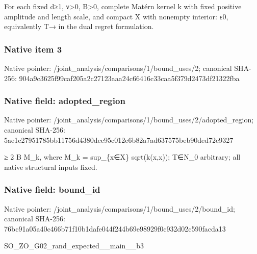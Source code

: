 \documentclass[10pt,a4paper]{article}
\begin{document}
\begingroup\raggedright\sloppy For each fixed d{\AtlasUnicodeSymbols ≥}\allowbreak{}1,\allowbreak{} {\AtlasUnicodeText ν}\allowbreak{}>0,\allowbreak{} B>0,\allowbreak{} complete Mat{\AtlasUnicodeText é}\allowbreak{}rn kernel k with fixed positive amplitude and length scale,\allowbreak{} and compact X with nonempty interior:\allowbreak{} {\AtlasUnicodeText ε}\allowbreak{}0,\allowbreak{} equivalently T{\AtlasUnicodeSymbols →}\allowbreak{} in the dual regret formulation.\par\endgroup

\subsubsection{Native item 3}
Native pointer: /joint\_\allowbreak{}analysis/comparisons/1/bound\_\allowbreak{}uses/2; canonical SHA-256: 904a9c3625f99caf205a2c27123aaa24c66416c33caa5f379d2473df21322fba

\subsubsection{Native field: adopted\_\allowbreak{}region}
Native pointer: /joint\_\allowbreak{}analysis/comparisons/1/bound\_\allowbreak{}uses/2/adopted\_\allowbreak{}region; canonical SHA-256: 5ae1c27951785bb11756d4380dcc95c012e6b82a7ad637575beb90ded72c9327

\begingroup\raggedright{}\allowbreak{} {\AtlasUnicodeSymbols ≥}\allowbreak{} 2 B M\_\allowbreak{}k,\allowbreak{} where M\_\allowbreak{}k =\allowbreak{} sup\_\allowbreak{}\{x{\AtlasUnicodeSymbols ∈}\allowbreak{}X\} sqrt(k(x,\allowbreak{}x));\allowbreak{} T{\AtlasUnicodeSymbols ∈}\allowbreak{}N\_\allowbreak{}0 arbitrary;\allowbreak{} all native structural inputs fixed.\par\endgroup

\subsubsection{Native field: bound\_\allowbreak{}id}
Native pointer: /joint\_\allowbreak{}analysis/comparisons/1/bound\_\allowbreak{}uses/2/bound\_\allowbreak{}id; canonical SHA-256: 76bc91a05a40c466b71f10b1dafe044f244b69e98929f0c932d02c590facda13

\begingroup\raggedright\sloppy SO\_\allowbreak{}ZO\_\allowbreak{}G02\_\allowbreak{}rand\_\allowbreak{}expected\_\allowbreak{}\_\allowbreak{}main\_\allowbreak{}\_\allowbreak{}b3\par\endgroup
\end{document}
